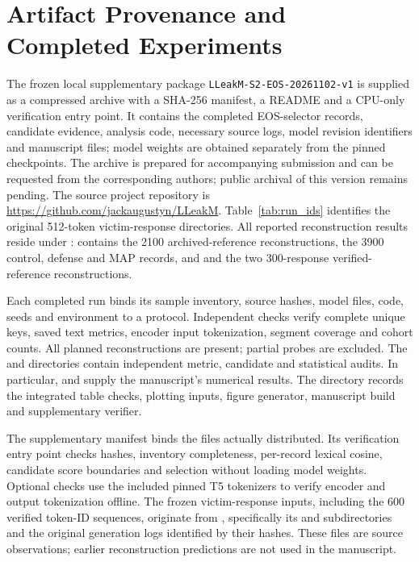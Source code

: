 \documentclass[electronics,article,submit,pdftex,moreauthors]{Definitions/mdpi}
\begin{document}
\section{Artifact Provenance and Completed Experiments}\label{app:runs}
The frozen local supplementary package \texttt{LLeakM-S2-EOS-20261102-v1} is supplied as a compressed archive with a SHA-256 manifest, a README and a CPU-only verification entry point. It contains the completed EOS-selector records, candidate evidence, analysis code, necessary source logs, model revision identifiers and manuscript files; model weights are obtained separately from the pinned checkpoints. The archive is prepared for accompanying submission and can be requested from the corresponding authors; public archival of this version remains pending. The source project repository is \url{https://github.com/jackaugustyn/LLeakM}. Table~\ref{tab:run_ids} identifies the original 512-token victim-response directories. All reported reconstruction results reside under :  contains the 2100 archived-reference reconstructions,  the 3900 control, defense and MAP records, and  and  the two 300-response verified-reference reconstructions.

Each completed run binds its sample inventory, source hashes, model files, code, seeds and environment to a protocol. Independent checks verify complete unique keys, saved text metrics, encoder input tokenization, segment coverage and cohort counts. All planned reconstructions are present; partial probes are excluded. The  and  directories contain independent metric, candidate and statistical audits. In particular,  and  supply the manuscript's numerical results. The  directory records the integrated table checks, plotting inputs, figure generator, manuscript build and supplementary verifier.

The supplementary manifest binds the files actually distributed. Its verification entry point checks hashes, inventory completeness, per-record lexical cosine, candidate score boundaries and selection without loading model weights. Optional checks use the included pinned T5 tokenizers to verify encoder and output tokenization offline. The frozen victim-response inputs, including the 600 verified token-ID sequences, originate from , specifically its  and  subdirectories and the original generation logs identified by their hashes. These files are source observations; earlier reconstruction predictions are not used in the manuscript.
\end{document}
